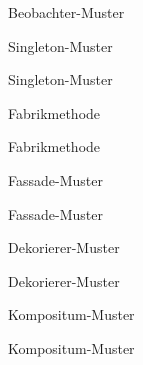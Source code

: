 \begin{example}{Beobachter-Muster}
    

    

    
\end{example}

\begin{defi}{Singleton-Muster}

\end{defi}

\begin{example}{Singleton-Muster}

\end{example}

\begin{defi}{Fabrikmethode}

\end{defi}

\begin{example}{Fabrikmethode}

\end{example}

\begin{defi}{Fassade-Muster}

\end{defi}

\begin{example}{Fassade-Muster}

\end{example}

\begin{defi}{Dekorierer-Muster}

\end{defi}

\begin{example}{Dekorierer-Muster}

\end{example}

\begin{defi}{Kompositum-Muster}

\end{defi}

\begin{example}{Kompositum-Muster}

\end{example}

